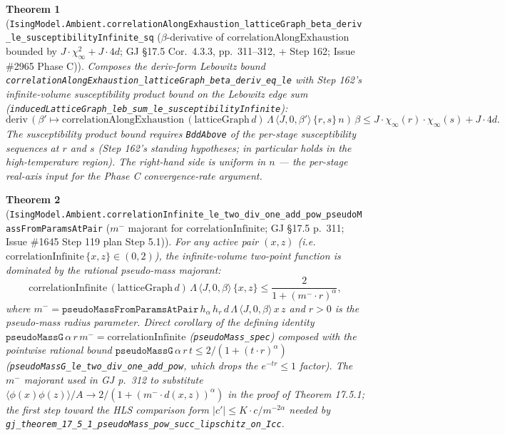\documentclass[a4paper,11pt]{article}
\newtheorem{theorem}{Theorem}
\begin{document}
\begin{theorem}[\texttt{IsingModel.Ambient.correlationAlongExhaustion\_latticeGraph\_beta\_deriv\_le\_susceptibilityInfinite\_sq}
($\beta$-derivative of $\mathrm{correlationAlongExhaustion}$ bounded by
$J\cdot\chi_\infty^2 + J\cdot 4d$; GJ \S17.5 Cor.~4.3.3, pp.~311--312, + Step 162;
Issue \#2965 Phase C)]
Composes the deriv-form Lebowitz bound
\texttt{correlationAlongExhaustion\_latticeGraph\_beta\_deriv\_eq\_le} with Step 162's
infinite-volume susceptibility product bound on the Lebowitz edge sum
(\texttt{inducedLatticeGraph\_leb\_sum\_le\_susceptibilityInfinite}):
\[
  \mathrm{deriv}\,(\beta'\mapsto\mathrm{correlationAlongExhaustion}\,(\mathrm{latticeGraph}\,d)\,
        \Lambda\,\langle J,0,\beta'\rangle\,\{r,s\}\,n)\,\beta
    \le J\cdot\chi_\infty(r)\cdot\chi_\infty(s) + J\cdot 4d.
\]
The susceptibility product bound requires \texttt{BddAbove} of the per-stage susceptibility
sequences at $r$ and $s$ (Step 162's standing hypotheses; in particular holds in the
high-temperature region). The right-hand side is uniform in $n$ — the per-stage real-axis
input for the Phase C convergence-rate argument.
\end{theorem}

\begin{theorem}[\texttt{IsingModel.Ambient.correlationInfinite\_le\_two\_div\_one\_add\_pow\_pseudoMassFromParamsAtPair}
($m^-$ majorant for $\mathrm{correlationInfinite}$; GJ \S17.5 p.~311; Issue \#1645 Step 119
plan Step 5.1)]
For any active pair $(x, z)$ (i.e.\ $\mathrm{correlationInfinite}\,\{x, z\}\in(0, 2)$), the
infinite-volume two-point function is dominated by the rational pseudo-mass majorant:
\[
  \mathrm{correlationInfinite}\,(\mathrm{latticeGraph}\,d)\,\Lambda\,\langle J,0,\beta\rangle\,
      \{x, z\} \le \frac{2}{1 + (m^-\cdot r)^{\alpha}},
\]
where $m^- = \mathtt{pseudoMassFromParamsAtPair}\,h_\alpha\,h_r\,d\,\Lambda\,\langle J,0,\beta\rangle\,x\,z$
and $r>0$ is the pseudo-mass radius parameter. Direct corollary of the defining identity
$\mathtt{pseudoMassG}\,\alpha\,r\,m^- = \mathrm{correlationInfinite}$ (\texttt{pseudoMass\_spec})
composed with the pointwise rational bound
$\mathtt{pseudoMassG}\,\alpha\,r\,t \le 2/(1 + (t\cdot r)^{\alpha})$
(\texttt{pseudoMassG\_le\_two\_div\_one\_add\_pow}, which drops the
$e^{-tr}\le 1$ factor). The $m^-$ majorant used in GJ p.~312 to substitute
$\langle\phi(x)\phi(z)\rangle/A\to 2/(1+(m^-\cdot d(x,z))^\alpha)$ in the proof of Theorem
17.5.1; the first step toward the HLS comparison form $|c'|\le K\cdot c / m^{-2\alpha}$
needed by \texttt{gj\_theorem\_17\_5\_1\_pseudoMass\_pow\_succ\_lipschitz\_on\_Icc}.
\end{theorem}
\end{document}
